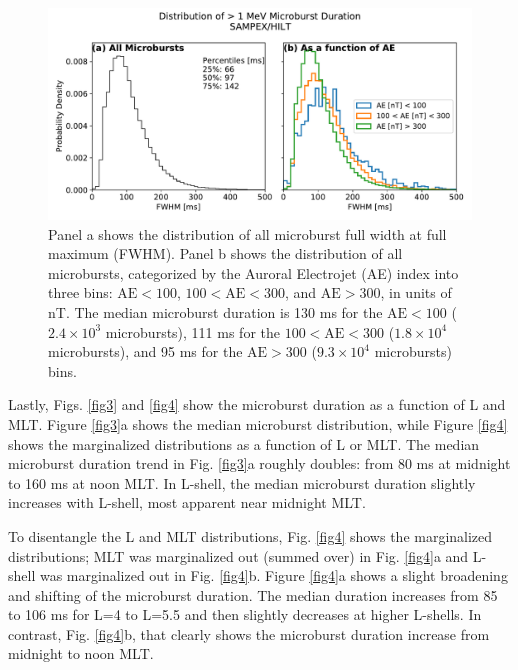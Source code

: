 \documentclass[draft]{agujournal2019}
\begin{document}
\begin{figure}
\noindent\includegraphics[width=\textwidth]{figures/fig2.pdf}
\caption{Panel a shows the distribution of all microburst full width at full maximum (FWHM). Panel b shows the distribution of all microbursts, categorized by the Auroral Electrojet (AE) index into three bins: $\mathrm{AE} < 100$, $100 < \mathrm{AE} < 300$, and $\mathrm{AE} > 300$, in units of nT. The median microburst duration is 130 ms for the $\mathrm{AE} < 100$ ($2.4\times 10^{3}$ microbursts), 111 ms for the $100 < \mathrm{AE} < 300$ ($1.8\times 10^{4}$ microbursts), and 95 ms for the $ \mathrm{AE} > 300$ ($9.3\times 10^{4}$ microbursts) bins.}
\label{fig2}
\end{figure}

Lastly, Figs. \ref{fig3} and \ref{fig4} show the microburst duration as a function of L and MLT. Figure \ref{fig3}a shows the median microburst distribution, while Figure \ref{fig4} shows the marginalized distributions as a function of L or MLT. The median microburst duration trend in Fig. \ref{fig3}a roughly doubles: from 80 ms at midnight to 160 ms at noon MLT. In L-shell, the median microburst duration slightly increases with L-shell, most apparent near midnight MLT.

To disentangle the L and MLT distributions, Fig. \ref{fig4} shows the marginalized distributions; MLT was marginalized out (summed over) in Fig. \ref{fig4}a and L-shell was marginalized out in Fig. \ref{fig4}b. Figure \ref{fig4}a shows a slight broadening and shifting of the microburst duration. The median duration increases from 85 to 106 ms for L=4 to L=5.5 and then slightly decreases at higher L-shells. In contrast, Fig. \ref{fig4}b, that clearly shows the microburst duration increase from midnight to noon MLT.
\end{document}
